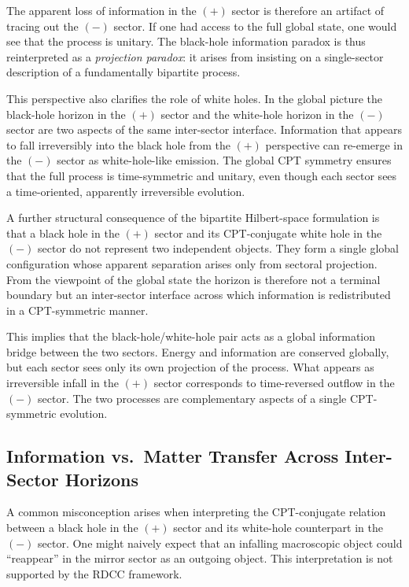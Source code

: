 \documentclass[11pt,a4paper]{article}
\begin{document}
The apparent loss of information in the \((+)\) sector is therefore an artifact of tracing out the 
\((-)\) sector. If one had access to the full global state, one would see that the process is 
unitary. The black-hole information paradox is thus reinterpreted as a \emph{projection paradox}: 
it arises from insisting on a single-sector description of a fundamentally bipartite process.

This perspective also clarifies the role of white holes. In the global picture the black-hole 
horizon in the \((+)\) sector and the white-hole horizon in the \((-)\) sector are two aspects of 
the same inter-sector interface. Information that appears to fall irreversibly into the black hole 
from the \((+)\) perspective can re-emerge in the \((-)\) sector as white-hole-like emission. 
The global CPT symmetry ensures that the full process is time-symmetric and unitary, even 
though each sector sees a time-oriented, apparently irreversible evolution.

A further structural consequence of the bipartite Hilbert-space formulation is that a black hole 
in the \((+)\) sector and its CPT-conjugate white hole in the \((-)\) sector do not represent two 
independent objects. They form a single global configuration whose apparent separation arises 
only from sectoral projection. From the viewpoint of the global state the horizon is therefore 
not a terminal boundary but an inter-sector interface across which information is redistributed 
in a CPT-symmetric manner.

This implies that the black-hole/white-hole pair acts as a global information bridge between 
the two sectors. Energy and information are conserved globally, but each sector sees only its 
own projection of the process. What appears as irreversible infall in the \((+)\) sector corresponds 
to time-reversed outflow in the \((-)\) sector. The two processes are complementary aspects of a 
single CPT-symmetric evolution.


\subsection{Information vs.\ Matter Transfer Across Inter-Sector Horizons}

A common misconception arises when interpreting the CPT-conjugate relation between a black
hole in the $(+)$ sector and its white-hole counterpart in the $(-)$ sector. One might naively
expect that an infalling macroscopic object could ``reappear'' in the mirror sector as an outgoing
object. This interpretation is not supported by the RDCC framework.
\end{document}
